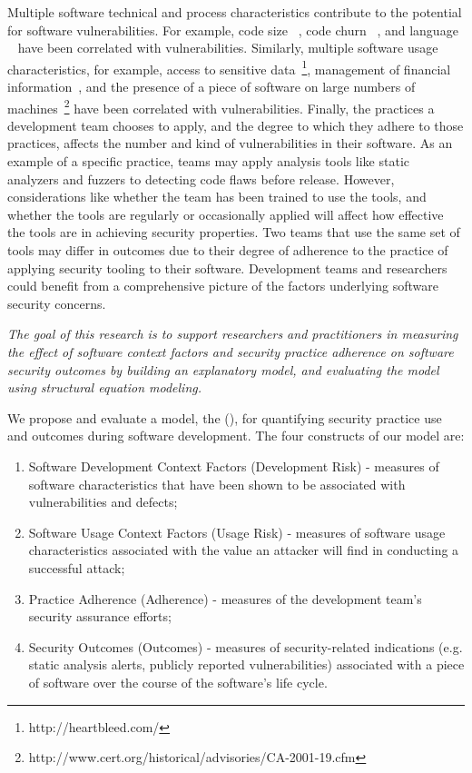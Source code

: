 Multiple software technical and process characteristics contribute to the potential for software vulnerabilities. For example, code size ~\cite{alhazmi2007measuring}, code churn ~\cite{shin2011evaluating,meneely2013when}, and language ~\cite{ray2014a} have been correlated with vulnerabilities. Similarly, multiple software usage characteristics, for example, access to sensitive data~\footnote{http://heartbleed.com/}, management of financial information~\cite{harris2014for}, and the presence of a piece of software on large numbers of machines~\footnote{http://www.cert.org/historical/advisories/CA-2001-19.cfm} have been correlated with vulnerabilities. Finally, the practices a development team chooses to apply, and the degree to which they adhere to those practices, affects the number and kind of vulnerabilities in their software. As an example of a specific practice, teams may apply analysis tools like static analyzers and fuzzers to detecting code flaws before release. However, considerations like whether the team has been trained to use the tools, and whether the tools are regularly or occasionally applied will affect how effective the tools are in achieving security properties.  Two teams that use the same set of tools may differ in outcomes due to their degree of adherence to the practice of applying security tooling to their software. Development teams and researchers could benefit from a comprehensive picture of the factors underlying software security concerns.

\textit{The goal of this research is to support researchers and practitioners in measuring the effect of software context factors and security practice adherence on software security outcomes by building an explanatory model, and evaluating the model using structural equation modeling.}

We propose and evaluate a model, the \ModelName (\ModelAbbr), for quantifying security practice use and outcomes during software development. The four constructs of our model are:
\begin{enumerate}
	\item Software Development Context Factors (Development Risk) - measures of software characteristics that have been shown to be associated with vulnerabilities and defects;
	\item Software Usage Context Factors (Usage Risk) - measures of software usage characteristics associated with the value an attacker will find in conducting a successful attack;
	\item Practice Adherence (Adherence) - measures of the development team's security assurance efforts; 
	\item Security Outcomes (Outcomes) - measures of security-related indications (e.g. static analysis alerts, publicly reported vulnerabilities) associated with a piece of software over the course of the software's life cycle.
\end{enumerate}

